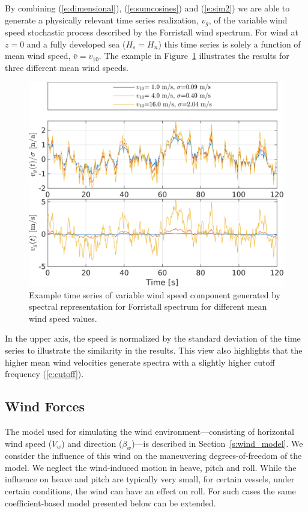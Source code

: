 \documentclass[11pt]{article}
\begin{document}
By combining (\ref{e:dimensional}), (\ref{e:sumcosines}) and (\ref{e:sim2}) we are able to generate a physically relevant time series realization, $v_g$, of the variable wind speed stochastic process described by the Forristall wind spectrum.  For wind at $z=0$ and a fully developed sea ($H_s=H_n$) this time series is solely a function of mean wind speed, $\bar{v}=v_{10}$. The example in Figure~\ref{f:forristall} illustrates the results for three different mean wind speeds.
\begin{figure}[h!]
  \centering
  \includegraphics[width=\SFc\textwidth]{src/foristall_time_ex.png}
  \caption{Example time series of variable wind speed component generated by spectral representation for Forristall spectrum for different mean wind speed values.}
  \label{f:forristall}
\end{figure}
In the upper axis, the speed is normalized by the standard deviation of the time series to illustrate the similarity in the results. This view also highlights that the higher mean wind velocities generate spectra with a slightly higher cutoff frequency (\ref{e:cutoff}).

\subsection{Wind Forces}
The model used for simulating the wind environment---consisting of horizontal wind speed ($V_w$) and direction ($\beta_w$)---is described in Section~\ref{s:wind_model}.  We consider the influence of this wind on the maneuvering degrees-of-freedom of the model.  We neglect the wind-induced motion in heave, pitch and roll.  While the influence on heave and pitch are typically very small, for certain vessels, under certain conditions, the wind can have an effect on roll.  For such cases the same coefficient-based model presented below can be extended.
\end{document}
